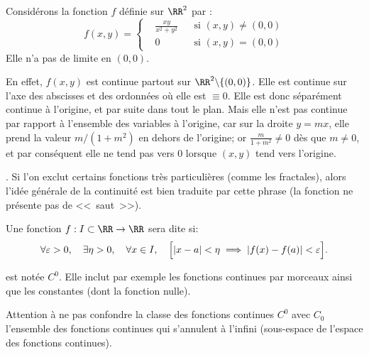 \medskip
Considérons la fonction $f$ définie sur $\RR^2$ par :
\begin{equation}
    f(x,y)=\left\{\begin{aligned}&\frac{xy}{x^2+y^2}&&\text{si $(x,y)\neq(0,0)$} \\
&0&&\text{si $(x,y)=(0,0)$} \end{aligned}\right.
\end{equation}
Elle n'a pas de limite en $(0,0)$.

\small
En effet, $f(x,y)$ est continue partout sur $\RR^2\backslash\{(0,0)\}$.
Elle est continue sur l'axe des abscisses et des ordonnées où elle est $\equiv0$.
Elle est donc séparément continue à l'origine, et par suite dans tout le plan.
Mais elle n'est pas continue par rapport à l'ensemble des variables à l'origine,
car sur la droite $y=mx$, elle prend la valeur $m/(1+m^2)$ en dehors de
l'origine; or $\frac{m}{1+m^2}\ne0$ dès que $m\ne0$, et par conséquent elle
ne tend pas vers $0$ lorsque $(x,y)$ tend vers l'origine.
\normalsize

\medskip
{}.
Si l'on exclut certains fonctions très particulières (comme les fractales), alors l'idée générale
de la continuité est bien traduite par cette phrase (la fonction ne présente pas de <<~saut~>>).

\medskip
\begin{definition}
Une fonction $f : I\subset\RR  \to \RR$ sera dite  si:
\begin{equation}
    \forall \varepsilon > 0, \quad \exists \eta > 0, \quad \forall x \in I, \quad \Bigl[|x - a| <\eta \implies |f(x) - f(a)|<\varepsilon\Bigr].
\end{equation}
\end{definition}

\medskip
{} est notée $C^0$.
Elle inclut par exemple les fonctions continues par morceaux ainsi que les constantes (dont
la fonction nulle).

\medskip
Attention à ne pas confondre la classe des fonctions continues $C^0$ avec
$C_0$ l'ensemble des fonctions continues qui s'annulent à l'infini (sous-espace de l'espace
des fonctions continues).

